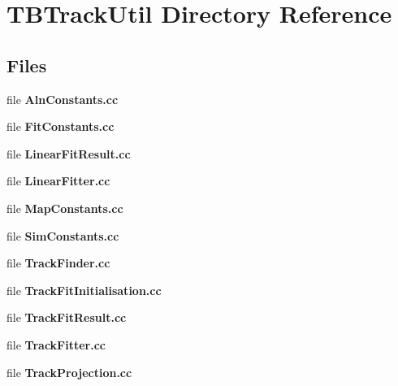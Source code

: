 \section{T\-B\-Track\-Util Directory Reference}
\label{dir_48a9b38e6e6d115d9c517b57231b3e5d}
\subsection*{Files}
\begin{DoxyCompactItemize}
\item 
file {\bfseries Aln\-Constants.\-cc}
\item 
file {\bfseries Fit\-Constants.\-cc}
\item 
file {\bfseries Linear\-Fit\-Result.\-cc}
\item 
file {\bfseries Linear\-Fitter.\-cc}
\item 
file {\bfseries Map\-Constants.\-cc}
\item 
file {\bfseries Sim\-Constants.\-cc}
\item 
file {\bfseries Track\-Finder.\-cc}
\item 
file {\bfseries Track\-Fit\-Initialisation.\-cc}
\item 
file {\bfseries Track\-Fit\-Result.\-cc}
\item 
file {\bfseries Track\-Fitter.\-cc}
\item 
file {\bfseries Track\-Projection.\-cc}
\end{DoxyCompactItemize}
